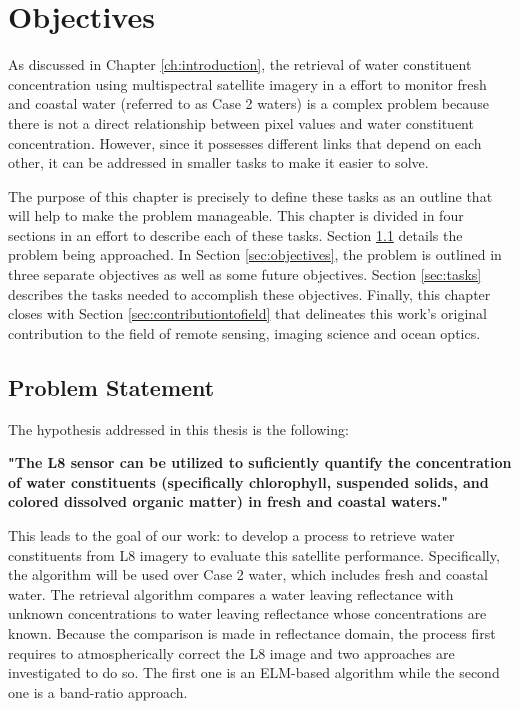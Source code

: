 \chapter{Objectives}
\label{ch:objectives}
As discussed in Chapter \ref{ch:introduction},  the retrieval of water constituent concentration using multispectral satellite imagery in a effort to monitor fresh and coastal water (referred to as Case 2 waters) is a complex problem because there is not a direct relationship between pixel values and water constituent concentration. However, since it possesses different links that depend on each other, it can be addressed in smaller tasks to make it easier to solve. 

The purpose of this chapter is precisely to define these tasks as an outline that will help to make the problem manageable. This chapter is divided in four sections in an effort to describe each of these tasks. Section \ref{sec:problemstatement} details the problem being approached. In Section \ref{sec:objectives}, the problem is outlined in {\color{red} three} separate objectives as well as some future objectives. Section \ref{sec:tasks} describes the tasks needed to accomplish these objectives. Finally, this chapter closes with Section \ref{sec:contributiontofield} that delineates this work's original contribution to the field of remote sensing, imaging science and ocean optics. 
\section{Problem Statement}
\label{sec:problemstatement}
The hypothesis addressed in this thesis is the following: 

{ \bf "The L8 sensor can be utilized to suficiently quantify the concentration of water constituents (specifically chlorophyll, { \color{red} suspended solids}, and colored dissolved organic matter) in fresh and coastal waters."} 

This leads to the goal of our work: to develop a process to retrieve water constituents from L8 imagery to evaluate this satellite performance. Specifically, the algorithm will be used over Case 2 water, which includes fresh and coastal water. The retrieval algorithm compares a water leaving reflectance with unknown concentrations to water leaving reflectance whose concentrations are known. Because the comparison is made in reflectance domain, the process first requires to atmospherically correct the L8 image and two approaches are investigated to do so. The first one is an ELM-based algorithm while the second one is a band-ratio approach.

